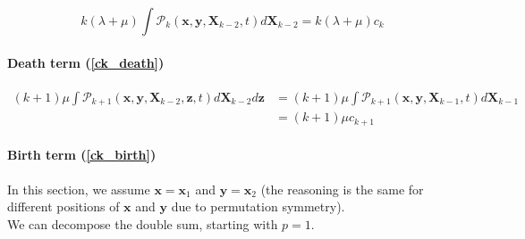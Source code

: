 \begin{equation}
k(\lambda+\mu)\int\mathcal{P}_{k}(\boldsymbol{x},\boldsymbol{y},\boldsymbol{X}_{k-2},t)d\boldsymbol{X}_{k-2}=k(\lambda+\mu)c_{k}\label{2nd_term_deriv}
\end{equation}


\paragraph*{Death term (\ref{ck_death})}

\begin{subequations} 
\begin{align}
(k+1)\mu\int\mathcal{P}_{k+1}(\boldsymbol{x},\boldsymbol{y},\boldsymbol{X}_{k-2},\boldsymbol{z},t)d\boldsymbol{X}_{k-2}d\boldsymbol{z} & =(k+1)\mu\int\mathcal{P}_{k+1}(\boldsymbol{x},\boldsymbol{y},\boldsymbol{X}_{k-1},t)d\boldsymbol{X}_{k-1}\label{ck_death_2}\\
 & =(k+1)\mu c_{k+1}\label{death_term_deriv}
\end{align}
\end{subequations}

\paragraph*{Birth term (\ref{ck_birth})}

\textbf{}


In this section, we assume $\boldsymbol{x}=\boldsymbol{x}_{1}$ and
$\boldsymbol{y}=\boldsymbol{x}_{2}$ (the reasoning is the same for
different positions of $\boldsymbol{x}$ and $\boldsymbol{y}$ due
to permutation symmetry). \\

We can decompose the double sum, starting with $p=1$.

